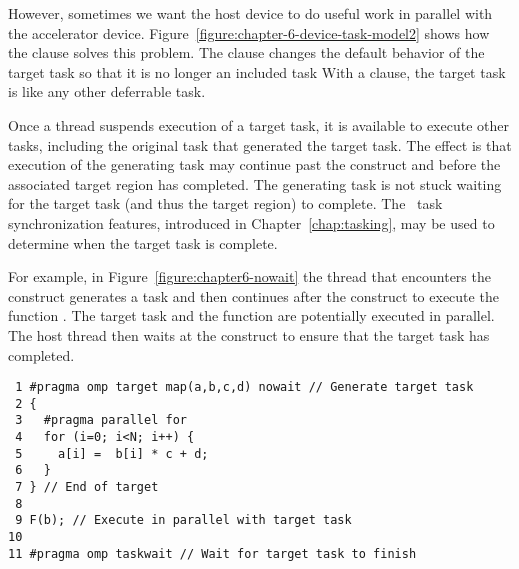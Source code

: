 However, sometimes we want the host device to do useful work in parallel with
the accelerator device. Figure~\ref{figure:chapter-6-device-task-model2} shows
how the  clause solves this problem.  The  clause
changes the default behavior of the target task so that it is no longer an
included task %
With a 
clause, the target task is like any other deferrable task.  

Once a thread suspends execution of a target task, it is available to execute
other tasks, including the original task that generated the target task.  The
effect is that execution of the generating task may continue past the
 construct and before the associated target region has completed.
The generating task is not stuck waiting for the target task (and thus the
target region) to complete.  The \OMP\ task synchronization features,
introduced in Chapter~\ref{chap:tasking}, may be used to determine
when the target task is complete.

For example, in Figure~\ref{figure:chapter6-nowait} the thread that encounters the
 construct generates a task and then continues after the
construct to execute the function .  The target task
and the function  are potentially executed in parallel.  The host
thread then waits at the  construct to ensure that the target
task has completed.

\begin{figure*}[!tbh]
\begin{verbatim}
 1 #pragma omp target map(a,b,c,d) nowait // Generate target task
 2 {
 3   #pragma parallel for
 4   for (i=0; i<N; i++) {
 5     a[i] =  b[i] * c + d;
 6   }
 7 } // End of target
 8 
 9 F(b); // Execute in parallel with target task
10
11 #pragma omp taskwait // Wait for target task to finish
\end{verbatim}
\caption{ \textbf {Code fragment with a target nowait region} -- \small
          The encountering thread generates a target task 
          and then continues past the target construct
          to execute the function \emph{F()}.
         }
\label{figure:chapter6-nowait}
\end{figure*}


